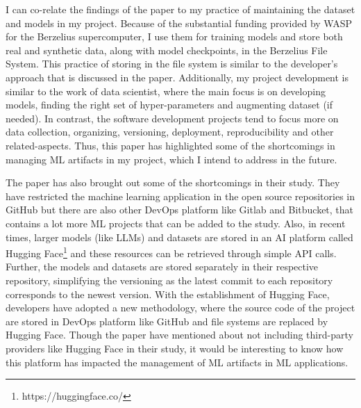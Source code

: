 \documentclass[a4paper, 11pt]{article}
\begin{document}
I can co-relate the findings of the paper to my practice of maintaining the dataset and models in my project. Because of the substantial funding provided by WASP for the Berzelius supercomputer, I use them for training models and store both real and synthetic data, along with model checkpoints, in the Berzelius File System. This practice of storing in the file system is similar to the developer's approach that is discussed in the paper. Additionally, my project development is similar to the work of data scientist, where the main focus is on developing models, finding the right set of hyper-parameters and augmenting dataset (if needed). In contrast, the software development projects tend to focus more on data collection, organizing, versioning, deployment, reproducibility and other related-aspects. Thus, this paper has highlighted some of the shortcomings in managing ML artifacts in my project, which I intend to address in the future.

The paper has also brought out some of the shortcomings in their study. They have restricted the machine learning application in the open source repositories in GitHub but there are also other DevOps platform like Gitlab and Bitbucket, that contains a lot more ML projects that can be added to the study. Also, in recent times, larger models (like LLMs) and datasets are stored in an AI platform called Hugging Face\footnote[1]{https://huggingface.co/} and these resources can be retrieved through simple API calls. Further, the models and datasets are stored separately in their respective repository, simplifying the versioning as the latest commit to each repository corresponds to the newest version. With the establishment of Hugging Face, developers have adopted a new methodology, where the source code of the project are stored in DevOps platform like GitHub and file systems are replaced by Hugging Face. Though the paper have mentioned about not including third-party providers like Hugging Face in their study, it would be interesting to know how this platform has impacted the management of ML artifacts in ML applications.    



\end{document}
